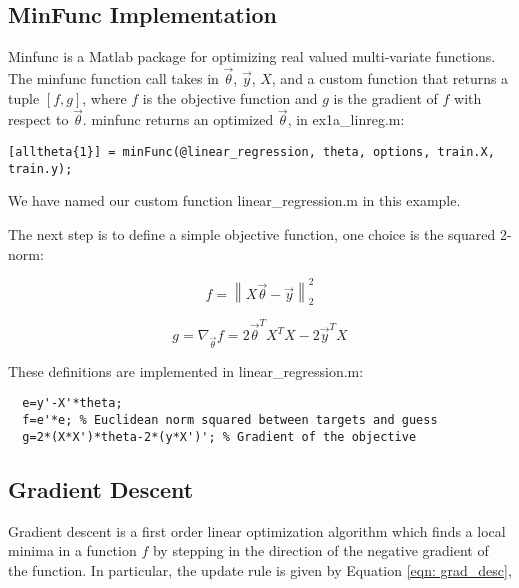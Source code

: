 \documentclass[12pt,oneside]{article}
\begin{document}
\begin{flushleft}
\subsection*{MinFunc Implementation}
Minfunc is a Matlab package for optimizing real valued multi-variate functions. The minfunc function call takes in $\vec{\theta}$, $\vec{y}$, $X$, and a custom function that returns a tuple $[f,g]$, where $f$ is the objective function and $g$ is the gradient of $f$ with respect to $\vec{\theta}$. minfunc returns an optimized $\vec{\theta}$, in ex1a\_linreg.m:

\begin{verbatim}
[alltheta{1}] = minFunc(@linear_regression, theta, options, train.X, train.y);
\end{verbatim}

We have named our custom function linear\_regression.m in this example.

The next step is to define a simple objective function, one choice is the squared 2-norm: 

\begin{equation}
f = \left \| X\vec{\theta} - \vec{y} \right \|_{2}^2
\end{equation}

\begin{equation}
g = \nabla_{\vec{\theta}} f =  2\vec{\theta}^T X^T X - 2\vec{y}^T X
\end{equation}\newline 

These definitions are implemented in linear\_regression.m:

\begin{verbatim}
  e=y'-X'*theta;
  f=e'*e; % Euclidean norm squared between targets and guess
  g=2*(X*X')*theta-2*(y*X')'; % Gradient of the objective 
\end{verbatim}

\subsection*{Gradient Descent}
Gradient descent is a first order linear optimization algorithm which finds a local minima in a function $f$ by stepping in the direction of the negative gradient of the function.  In particular, the update rule is given by Equation \ref{eqn: grad_desc},


\end{flushleft}
\end{document}

